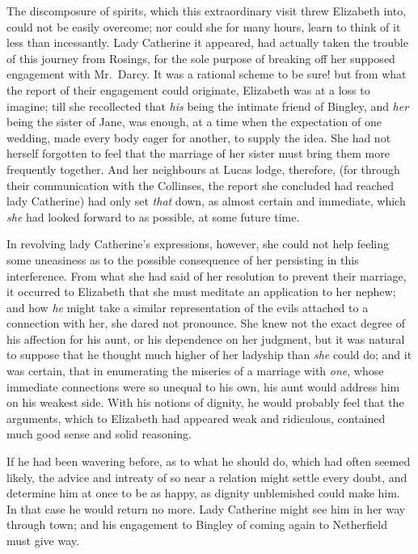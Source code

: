 
The discomposure of spirits, which this extraordinary
visit threw Elizabeth into, could not be easily overcome;
nor could she for many hours, learn to think of it less
than incessantly. Lady Catherine it appeared, had
actually taken the trouble of this journey from Rosings,
for the sole purpose of breaking off her supposed engagement
with Mr.\ Darcy. It was a rational scheme to be
sure! but from what the report of their engagement could
originate, Elizabeth was at a loss to imagine; till she
recollected that \textit{his} being the intimate friend of Bingley,
and \textit{her} being the sister of Jane, was enough, at a time
when the expectation of one wedding, made every body
eager for another, to supply the idea. She had not herself
forgotten to feel that the marriage of her sister must bring
them more frequently together. And her neighbours at
Lucas lodge, therefore, (for through their communication
with the Collinses, the report she concluded had reached
lady Catherine) had only set \textit{that} down, as almost certain
and immediate, which \textit{she} had looked forward to as possible,
at some future time.

In revolving lady Catherine’s expressions, however, she
could not help feeling some uneasiness as to the possible
consequence of her persisting in this interference. From
what she had said of her resolution to prevent their
marriage, it occurred to Elizabeth that she must meditate
an application to her nephew; and how \textit{he} might take
a similar representation of the evils attached to a connection
with her, she dared not pronounce. She knew not
the exact degree of his affection for his aunt, or his dependence
on her judgment, but it was natural to suppose
that he thought much higher of her ladyship than \textit{she}
could do; and it was certain, that in enumerating the
miseries of a marriage with \textit{one}, whose immediate connections
were so unequal to his own, his aunt would address
him on his weakest side. With his notions of dignity, he
would probably feel that the arguments, which to Elizabeth
had appeared weak and ridiculous, contained much
good sense and solid reasoning.

If he had been wavering before, as to what he should
do, which had often seemed likely, the advice and intreaty
of so near a relation might settle every doubt, and determine
him at once to be as happy, as dignity unblemished
could make him. In that case he would return no more.
Lady Catherine might see him in her way through town;
and his engagement to Bingley of coming again to Netherfield
must give way.


